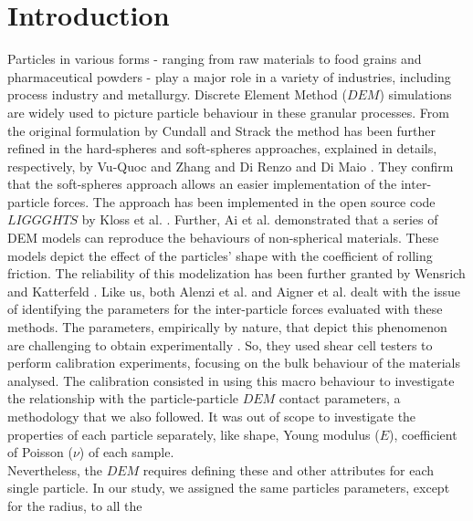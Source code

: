 \section{Introduction}
\label{sec:introduction}

Particles in various forms - ranging from raw materials to food grains and pharmaceutical powders - 
play a major role in a variety of industries, including process industry and
metallurgy.
Discrete Element Method ($DEM$) simulations are widely used to picture particle
behaviour in these granular processes.
From the original formulation by Cundall and Strack \cite{RefWorks:172}
the method has been further refined in the hard-spheres and soft-spheres
approaches, explained in details, respectively, by Vu-Quoc and Zhang
\cite{RefWorks:148} and Di Renzo and Di Maio \cite{RefWorks:145}.
They \cite{RefWorks:145} confirm that the soft-spheres approach
allows an easier implementation of the inter-particle forces.
The approach has been implemented in the open source code $LIGGGHTS$ by
Kloss et al. \cite{RefWorks:136}.
Further, Ai et al. \cite{RefWorks:131} demonstrated that a series of DEM
models can reproduce the behaviours of non-spherical materials.
These models depict the effect of the particles' shape with the coefficient
of rolling friction.
The reliability of this modelization has been further granted by Wensrich and 
Katterfeld \cite{RefWorks:87}.
Like us, both Alenzi et al. \cite{RefWorks:91} and Aigner et al.
\cite{RefWorks:139} dealt with the issue of identifying the parameters for the
inter-particle forces evaluated with these methods.
The parameters, empirically by nature, that depict this phenomenon are challenging
to obtain experimentally \cite{RefWorks:148, RefWorks:145, RefWorks:136,
RefWorks:131, RefWorks:87, RefWorks:91, RefWorks:139}.
So, they used shear cell testers to perform calibration experiments, 
focusing on the bulk behaviour of the materials analysed.
The calibration consisted in using this macro behaviour to 
investigate the relationship with the particle-particle $DEM$
contact parameters, a methodology that we also followed.
It was out of scope to investigate the properties of each
particle separately, like shape, Young modulus ($E$), coefficient of Poisson ($\nu$) of each sample.\\
Nevertheless, the $DEM$ requires defining these and other attributes for each
single particle.
In our study, we assigned the same particles parameters, except for the radius, to all the 
